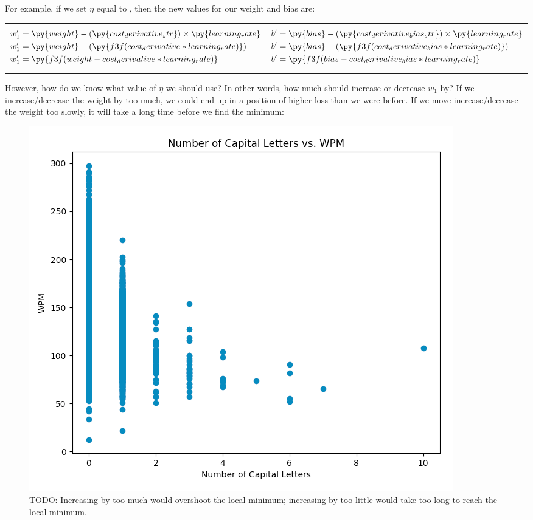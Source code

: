 \documentclass[12pt]{article}
\begin{document}
{
\setlength{\abovedisplayskip}{0pt}
\setlength{\belowdisplayskip}{0pt}
For example, if we set $\eta$ equal to , then the new values for our weight and bias are:
\begin{center}
	\begin{tabularx}{0.8\linewidth}{X X}
		\vbox{
			\begin{align*}
				w_1' & = \py{weight} - (\py{cost_derivative_str}) \times \py{learning_rate}
				\\
				w_1' & = \py{weight} - (\py{f3f(cost_derivative * learning_rate)})
				\\
				w_1' & = \py{f3f(weight - cost_derivative * learning_rate)}
			\end{align*}
		} &
		\vbox{
			\begin{align*}
				b' & = \py{bias} - (\py{cost_derivative_bias_str}) \times \py{learning_rate}
				\\
				b' & = \py{bias} - (\py{f3f(cost_derivative_bias * learning_rate)})
				\\
				b' & = \py{f3f(bias - cost_derivative_bias * learning_rate)}
			\end{align*}
		}
	\end{tabularx}
\end{center}
}

However, how do we know what value of $\eta$ we should use? In other words, how much should increase or decrease $w_1$ by? If we increase/decrease the weight by too much, we could end up in a position of higher loss than we were before. If we move increase/decrease the weight too slowly, it will take a long time before we find the minimum:

\begin{figure}[H]
	\centering
	\caption{TODO: Increasing by too much would overshoot the local minimum; increasing by too little would take too long to reach the local minimum.}
	\includegraphics{todo.png}
\end{figure}
\end{document}

